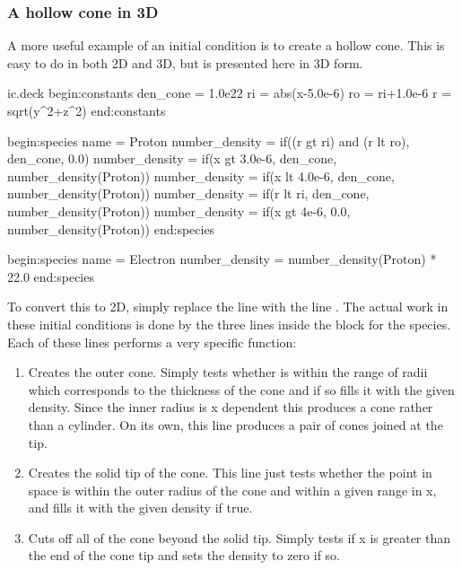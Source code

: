 \subsubsection{A hollow cone in 3D}
A more useful example of an initial condition is to create a hollow cone. This
is easy to do in both 2D and 3D, but is presented here in 3D form.
\begin{lboxverbatim}{ic.deck}
begin:constants
   den_cone = 1.0e22
   ri = abs(x-5.0e-6)
   ro = ri+1.0e-6
   r = sqrt(y^2+z^2)
end:constants

begin:species
   name = Proton
   number_density = if((r gt ri) and (r lt ro), den_cone, 0.0)
   number_density = if(x gt 3.0e-6, den_cone, number_density(Proton))
   number_density = if(x lt 4.0e-6, den_cone, number_density(Proton))
   number_density = if(r lt ri, den_cone, number_density(Proton))
   number_density = if(x gt 4e-6, 0.0, number_density(Proton))
end:species

begin:species
   name = Electron
   number_density = number_density(Proton) * 22.0
end:species
\end{lboxverbatim}

To convert this to 2D, simply replace the line
 with the line . The
actual work in these initial conditions is done by the three lines inside the
block for the  species. Each of these lines performs a very
specific function:

\begin{enumerate}
\item Creates the outer cone. Simply tests whether  is within
  the range of radii which corresponds to the thickness of the cone and if so
  fills it with the given density. Since the inner radius is x dependent this
  produces a cone rather than a cylinder. On its own, this line produces a
  pair of cones joined at the tip.
\item Creates the solid tip of the cone. This line just tests whether the
  point in space is within the outer radius of the cone and within a given
  range in x, and fills it with the given density if true.
\item Cuts off all of the cone beyond the solid tip. Simply tests if x is
  greater than the end of the cone tip and sets the density to zero if so.
\end{enumerate}


